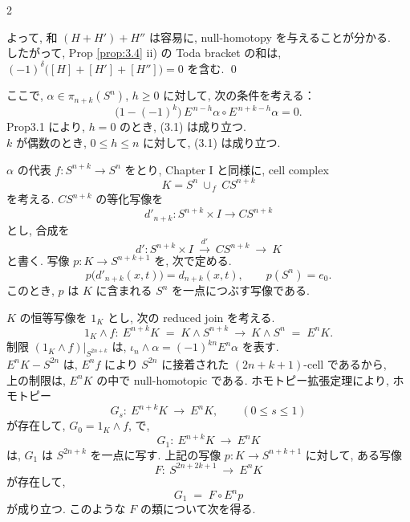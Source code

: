 \documentclass[10pt, leqno]{ltjsarticle}
\newcommand{\Ex}{E}        %
\newcommand{\pis}[2]{\pi_{#1}(#2)}       %
\numberwithin{equation}{section}
\theoremstyle{plain}
\theoremstyle{definition}
\theoremstyle{remark}
\begin{document}
\begin{paracol}{2}

\noindent
よって, 和 $(H+H')+H''$ は容易に, null-homotopy を与えることが分かる. \\
したがって,
Prop \ref{prop:3.4} ii) の Toda bracket の和は,
\(
(-1)^{\delta}\bigl([H]+[H']+[H'']\bigr)=0
\)
を含む. 
\qed

ここで, $\alpha\in\pis{n+k}{S^n}$, $h\ge0$ に対して, 次の条件を考える：
\begin{equation}\label{3.1}
\bigl(1-(-1)^k\bigr)\, \Ex^{\,n-h}\alpha \circ \Ex^{\,n+k-h}\alpha = 0.
\end{equation}
Prop3.1 により, $h=0$ のとき, (3.1) は成り立つ. \\
$k$ が偶数のとき, $0\le h\le n$ に対して, (3.1) は成り立つ. 

\medskip
$\alpha$ の代表 $f:S^{n+k}\to S^n$ をとり, Chapter I と同様に,
cell complex
\[
K = S^n\ \cup_{\,f}\ CS^{n+k}
\]
を考える. $CS^{n+k}$ の等化写像を
\[
d'_{n+k}:S^{n+k}\times I\longrightarrow CS^{n+k}
\]
とし, 合成を
\[
d':S^{n+k}\times I\ \xrightarrow{d'}\ CS^{n+k}\ \rightarrow\ K
\]
と書く. 写像 $p:K\to S^{n+k+1}$ を, 次で定める.
\[
p\bigl(d'_{n+k}(x,t)\bigr)=d_{n+k}(x,t),\qquad 
p(S^n) = e_0.
\]
このとき, $p$ は $K$ に含まれる $S^n$ を一点につぶす写像である.

$K$ の恒等写像を $1_K$ とし, 次の reduced join を考える.
\[
1_K \wedge f:\ \Ex^{n+k}K \;=\; K \wedge S^{n+k}\ \longrightarrow\ K \wedge S^{n}\;=\;\Ex^{n}K.
\]
制限
\((1_K \wedge f) \big|_{S^{2n+k}}\) は, 
$\iota_n \wedge \alpha = (-1)^{kn}E^n \alpha$ を表す. \\
$\Ex^{n}K - S^{2n}$ は, $\Ex^{n}\!f$ により $S^{2n}$ に接着された
$(2n+k+1)$-cell であるから, \\
上の制限は, $\Ex^{n}K$ の中で null-homotopic である. 
ホモトピー拡張定理により, ホモトピー
\[
G_s:\ \Ex^{n+k}K\ \longrightarrow\ \Ex^{n}K, \qquad (0\le s\le1)
\]
が存在して, $G_0=1_K \wedge f$, で, 
\[
G_1:\ \Ex^{n+k}K\ \longrightarrow\ \Ex^{n}K
\]
は, $G_1$ は $S^{2n+k}$ を一点に写す. 
上記の写像 $p:K\to S^{n+k+1}$ に対して, ある写像
\[
F:\ S^{2n+2k+1}\ \longrightarrow\ \Ex^{n}K
\]
が存在して,
\[
G_1\;=\;F\circ \Ex^{n}p
\]
が成り立つ. このような $F$ の類について次を得る. 

\switchcolumn


\end{paracol}
\end{document}

